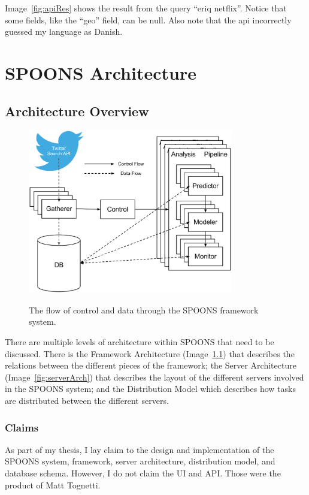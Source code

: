 \documentclass[12pt]{ucthesis}
\newcommand{\captionfonts}{\small\bf\ssp}
\begin{document}
Image~\ref{fig:apiRes} shows the result from the query ``eriq netflix''. Notice that some fields,
like the ``geo'' field, can be null. Also note that the api incorrectly guessed my language as Danish.

\chapter{SPOONS Architecture}
\label{arch}

\section{Architecture Overview}
\label{arch-overview}
\begin{figure}
   \begin{center}
      \includegraphics[width=0.8\textwidth]{images/SPOONS_Framework_Architecture.eps}
      \captionfonts
      \caption[SPOONS Framework Architecture]{The flow of control and data through the SPOONS framework system.}
      \label{fig:frameworkArch}
   \end{center}
\end{figure}

There are multiple levels of architecture within SPOONS that need to be discussed.
There is the Framework Architecture (Image~\ref{fig:frameworkArch}) that describes the relations between the
different pieces of the framework; the Server Architecture (Image~\ref{fig:serverArch}) that describes the layout of
the different servers involved in the SPOONS system; and the Distribution Model which describes how tasks are
distributed between the different servers.

\subsection{Claims}
\label{arch-claims}
As part of my thesis, I lay claim to the design and implementation of the SPOONS system, framework, server architecture,
distribution model, and database schema. However, I do not claim the UI and API. Those were the product of Matt Tognetti.
\end{document}
